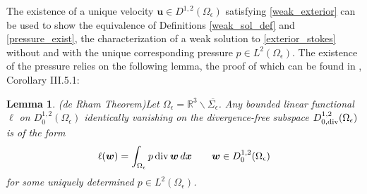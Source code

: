 \documentclass[11pt]{article}
\numberwithin{equation}{section}
\newcommand{\R}{\mathbb{R}}
\newcommand{\bu}{\bm{u}}
\newcommand{\bw}{\bm{w}}
\newcommand{\bx}{\bm{x}}
\newcommand{\ts}{\thinspace}
\newcommand{\dive}{{\rm{div}}}
\newtheorem{lemma}[theorem]{Lemma}
\theoremstyle{definition}
\begin{document}
The existence of a unique velocity $\bu\in D^{1,2}(\Omega_{\epsilon})$ satisfying \eqref{weak_exterior} can be used to show the equivalence of Definitions \ref{weak_sol_def} and \ref{pressure_exist}, the characterization of a weak solution to \eqref{exterior_stokes} without and with the unique corresponding pressure $p\in L^2(\Omega_{\epsilon})$. The existence of the pressure relies on the following lemma, the proof of which can be found in \cite{galdi2011introduction}, Corollary III.5.1:
\begin{lemma}\emph{(de Rham Theorem)}\label{de_rham}
Let $\Omega_{\epsilon}=\R^3 \backslash\overline{\Sigma_{\epsilon}}$. Any bounded linear functional $\ell$ on $D^{1,2}_0(\Omega_{\epsilon})$ identically vanishing on the divergence-free subspace $D^{1,2}_{0,\dive}(\Omega_{\epsilon})$ is of the form 
\[ \ell(\bw)=\int_{\Omega_{\epsilon}} p \ts \dive\ts \bw \ts d\bx \qquad  \bw \in D_0^{1,2}(\Omega_{\epsilon})\]
for some uniquely determined $p\in L^2(\Omega_{\epsilon})$. 
\end{lemma}
\end{document}
